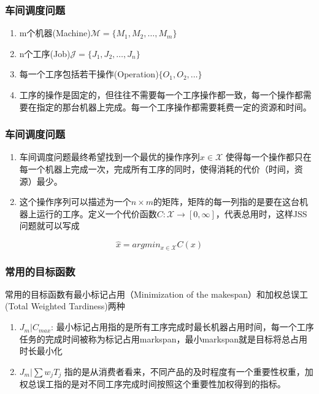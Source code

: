 \begin{frame}
    \frametitle{车间调度问题}
    \begin{enumerate}
        \item m个机器(Machine)$\mathcal{M}=\{M_1,M_2,\dots,M_m\}$
        \item n个工序(Job)$\mathcal{J}=\{J_1,J_2,\dots,J_n\}$
        \item 每一个工序包括若干操作(Operation)$\{O_1,O_2,\dots\}$
        \item 工序的操作是固定的，但往往不需要每一个工序操作都一致，每一个操作都需要在指定的那台机器上完成。每一个工序操作都需要耗费一定的资源和时间。
    \end{enumerate}
\end{frame}
\begin{frame}
    \frametitle{车间调度问题}
    \begin{enumerate}
        \item 车间调度问题最终希望找到一个最优的操作序列$x\in \mathcal{X}$ 使得每一个操作都只在每一个机器上完成一次，完成所有工序的同时，使得消耗的代价（时间，资源）最少。
        \item 这个操作序列可以描述为一个$n\times m$的矩阵，矩阵的每一列指的是要在这台机器上运行的工序。定义一个代价函数$C:\mathcal{X}\rightarrow [0,\infty]$，代表总用时，这样JSS问题就可以写成
    \end{enumerate}
    $$\hat{x}=argmin_{x\in \mathcal{X}}C(x)$$
\end{frame}

\begin{frame}
    \frametitle{常用的目标函数}
    常用的目标函数有最小标记占用（Minimization of the makespan）和加权总误工(Total Weighted Tardiness)两种

    \begin{enumerate}
        \item $J_m|C_{max}$: 最小标记占用指的是所有工序完成时最长机器占用时间，每一个工序任务的完成时间被称为标记占用markspan，最小markspan就是目标将总占用时长最小化
        \item $J_m|\sum w_jT_j$ 指的是从消费者看来，不同产品的及时程度有一个重要性权重，加权总误工指的是对不同工序完成时间按照这个重要性加权得到的指标。
    \end{enumerate}
\end{frame}

